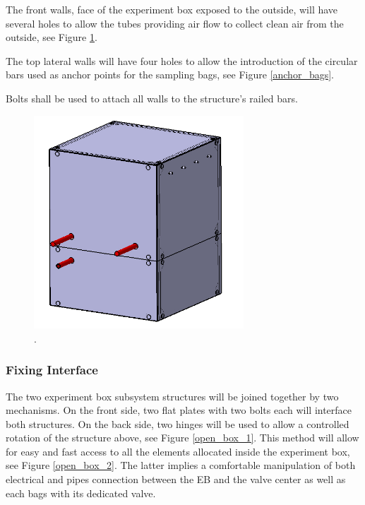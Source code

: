 The front walls, face of the experiment box exposed to the outside, will have several holes to allow the tubes providing air flow to collect clean air from the outside, see Figure \ref{front_wall_holes}.

The top lateral walls will have four holes to allow the introduction of the circular bars used as anchor points for the sampling bags, see Figure \ref{anchor_bags}.

Bolts shall be used to attach all walls to the structure's railed bars.


\begin{figure}[!ht]
    \centering
    \includegraphics[width=0.7\textwidth]{4-experiment-design/img/frontal_holes.jpg}
    \caption{.}
    \label{front_wall_holes}
\end{figure}

\pagebreak
\subsubsection{Fixing Interface}

The two experiment box subsystem structures will be joined together by two mechanisms. On the front side, two flat plates with two bolts each will interface both structures. On the back side, two hinges will be used to allow a controlled rotation of the structure above, see Figure \ref{open_box_1}. This method will allow for easy and fast access to all the elements allocated inside the experiment box, see Figure \ref{open_box_2}. The latter implies a comfortable manipulation of both electrical and pipes connection between the EB and the valve center as well as each bags with its dedicated valve. 

